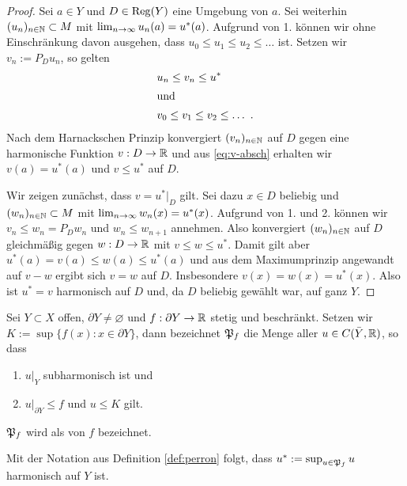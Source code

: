 \begin{proof}
  Sei $a \in Y$ und $D \in \operatorname{Reg}(Y)$ eine Umgebung von $a$. Sei
  weiterhin \break$(u_n)_{n \in \mathbb{N}} \subset M$ mit $\lim_{n \rightarrow \infty}
  u_n(a) = u^\ast(a)$. Aufgrund von 1. können wir ohne Einschränkung davon ausgehen, dass
  $u_0 \leq u_1 \leq u_2 \leq \dots$ ist. Setzen wir $v_n := P_D u_n$, so gelten
  \begin{align}
    & u_n \leq v_n \leq u^\ast \label{eq:v-absch} \\
    \intertext{und}
   & v_0 \leq v_1 \leq v_2 \leq \dots \ . \nonumber
  \end{align}
  Nach dem Harnackschen Prinzip konvergiert $(v_n)_{n \in \mathbb{N}}$ auf $D$
  gegen eine harmonische \break Funktion $v: D \rightarrow \mathbb{R}$ und aus
  \eqref{eq:v-absch} erhalten wir $v(a) = u^\ast(a)$ und $v \leq
  u^\ast$ auf $D$.
  
  Wir zeigen zunächst, dass $v = u^\ast|_D$ gilt. Sei dazu $x \in
  D$ beliebig und $(w_n)_{n\in \mathbb{N}}\subset M$ mit
  $\lim_{n \rightarrow \infty}w_n(x) = u^\ast(x)$. Aufgrund von 1. und
  2. können wir $v_n \leq w_n = P_D w_n$ und \break$w_n
  \leq w_{n+1}$ annehmen. Also konvergiert $(w_n)_{n \in \mathbb{N}}$ auf $D$
  gleichmäßig gegen $w: D \rightarrow \mathbb{R}$ mit $v \leq w \leq u^\ast$. Damit
  gilt aber $u^\ast(a) = v(a) \leq w(a) \leq u^\ast(a)$ und aus
  dem Maximumprinzip angewandt auf $v-w$ ergibt sich $v = w$ auf
  $D$. Insbesondere $v(x) = w(x) = u^\ast(x)$. Also ist $u^\ast = v$
  harmonisch auf $D$ und, da $D$ beliebig gewählt
  war, auf ganz $Y$.
\end{proof}

\begin{defin}
  \label{def:perron}
  Sei $Y \subset X$ offen, $\partial Y \neq \varnothing$ und
  $f: \partial Y \rightarrow \mathbb{R}$ stetig und beschränkt. Setzen wir $K :=
  \sup\{f(x) : x \in \partial Y\}$, dann bezeichnet
  $\mathfrak{P}_f$ die Menge aller $u \in C(\bar Y, \mathbb{R})$, so dass
  \begin{enumerate}
  \item $u|_Y$ subharmonisch ist und
  \item $u|_{\partial Y} \leq f$ und $u \leq K$ gilt.
  \end{enumerate}
  $\mathfrak{P}_f$ wird als  von $f$ bezeichnet.
\end{defin}

\begin{cor}
  Mit der Notation aus Definition \ref{def:perron} folgt, dass $u^\ast := \sup_{u
    \in \mathfrak{P}_f} u$ harmonisch auf $Y$ ist.
\end{cor}

